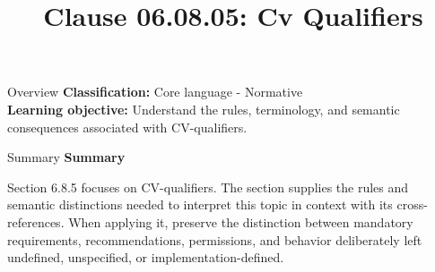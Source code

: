\documentclass[10pt,letterpaper]{article}
\title{Clause 06.08.05: Cv Qualifiers}
\author{}
\date{}
\begin{document}
\maketitle
\begin{CornellOverviewBox}{Overview}
\textbf{Classification:} Core language - Normative\\[2pt]
\textbf{Learning objective:} Understand the rules, terminology, and semantic consequences associated with CV-qualifiers.
\end{CornellOverviewBox}\begin{CornellSummaryBox}{Summary}
{\sffamily\bfseries\color{Accent} Summary}\par\vspace{3pt}Section 6.8.5 focuses on CV-qualifiers. The section supplies the rules and semantic distinctions needed to interpret this topic in context with its cross-references. When applying it, preserve the distinction between mandatory requirements, recommendations, permissions, and behavior deliberately left undefined, unspecified, or implementation-defined.
\end{CornellSummaryBox}
\end{document}
